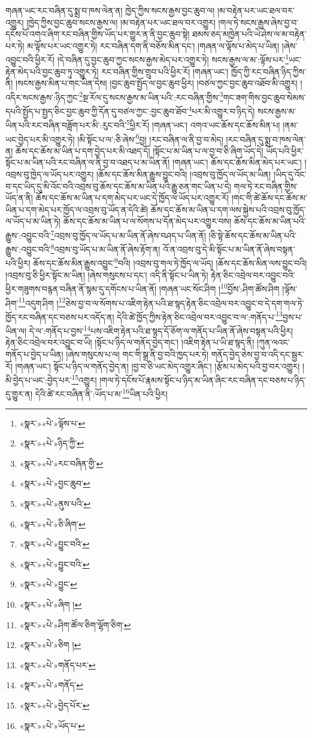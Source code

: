 གཞན་ཡང་རང་བཞིན་དུ་སྨྲ་བ་ཁས་ལེན་ན། ཁྱེད་ཀྱིས་སངས་རྒྱས་བྱང་ཆུབ་ལ། །མ་བརྟེན་པར་ཡང་ཐལ་བར་འགྱུར། །ཁྱེད་ཀྱིས་བྱང་ཆུབ་སངས་རྒྱས་ལ། །མ་བརྟེན་པར་ཡང་ཐལ་བར་འགྱུར། །གལ་ཏེ་སངས་རྒྱས་ཞེས་བྱ་བ་དངོས་པོ་འགའ་ཞིག་རང་བཞིན་གྱིས་ཡོད་པར་གྱུར་ན་ནི་བྱང་ཆུབ་སྟེ། ཐམས་ཅད་མཁྱེན་པའི་ཡེ་ཤེས་ལ་མ་བརྟེན་པར་ཏེ། མ་ལྟོས་པར་ཡང་འགྱུར་ཏེ། རང་བཞིན་དག་ནི་བཅོས་མིན་དང་། །གཞན་ལ་ལྟོས་པ་མེད་པ་ཡིན། །ཞེས་འབྱུང་བའི་ཕྱིར་རོ། །དེ་བཞིན་དུ་བྱང་ཆུབ་ཀྱང་སངས་རྒྱས་མེད་པར་འགྱུར་ཏེ། སངས་རྒྱས་ལ་མ་:ལྟོས་པར་\footnote{«སྣར་»«པེ་»ལྟོས་པ་}ཡང་རྟེན་མེད་པའི་བྱང་ཆུབ་ཏུ་འགྱུར་ཏེ། རང་བཞིན་གྱིས་གྲུབ་པའི་ཕྱིར་རོ། །གཞན་ཡང་། ཁྱོད་ཀྱི་རང་བཞིན་ཉིད་ཀྱིས་ནི། །སངས་རྒྱས་མིན་པ་གང་ཡིན་དེས། །བྱང་ཆུབ་སྤྱོད་ལ་བྱང་ཆུབ་ཕྱིར། །བཙལ་ཀྱང་བྱང་ཆུབ་འཐོབ་མི་འགྱུར། །འདིར་སངས་རྒྱས་:ཉིད་ཀྱང་\footnote{«སྣར་»«པེ་»ཉིད་ཀྱི་}སྔ་རོལ་དུ་སངས་རྒྱས་མ་ཡིན་པའི་:རང་བཞིན་གྱིས་\footnote{«སྣར་»«པེ་»རང་བཞིན་གྱི་}གང་ཟག་གིས་བྱང་ཆུབ་སེམས་དཔའི་སྤྱོད་པ་སྤྱད་ཅིང་བྱང་ཆུབ་ཀྱི་དོན་དུ་བཙལ་ཀྱང་:བྱང་ཆུབ་ཐོབ་\footnote{«སྣར་»«པེ་»བྱང་ཆུབ་}པར་མི་འགྱུར་བ་ཉིད་དེ། སངས་རྒྱས་མ་ཡིན་པའི་རང་བཞིན་བཟློག་པར་མི་:རུང་བའི་\footnote{«སྣར་»«པེ་»ནུས་པའི་}ཕྱིར་རོ། །གཞན་ཡང་། འགའ་ཡང་ཆོས་དང་ཆོས་མིན་པ། །ནམ་ཡང་བྱེད་པར་མི་འགྱུར་ཏེ། །མི་སྟོང་པ་ལ་:ཅི་ཞེས་\footnote{«སྣར་»«པེ་»ཅི་ཞིག་}བྱ། །རང་བཞིན་ལ་ནི་བྱ་བ་མེད། །རང་བཞིན་དུ་སྨྲ་བ་ཁས་ལེན་ན། ཆོས་དང་ཆོས་མ་ཡིན་པ་དག་བྱེད་པར་མི་འཐད་དོ། །སྟོང་པ་མ་ཡིན་པ་ལ་བྱ་བ་ཅི་ཞིག་ཡོད་དེ། ཡོད་པའི་ཕྱིར་སྟོང་པ་མ་ཡིན་པའི་རང་བཞིན་ལ་ནི་བྱ་བ་འཐད་པ་མ་ཡིན་ནོ། །གཞན་ཡང་། ཆོས་དང་ཆོས་མིན་མེད་པར་ཡང་། །འབྲས་བུ་ཁྱེད་ལ་ཡོད་པར་འགྱུར། །ཆོས་དང་ཆོས་མིན་རྒྱུས་བྱུང་བའི། །འབྲས་བུ་ཁྱོད་ལ་ཡོད་མ་ཡིན། །ཡིད་དུ་འོང་བ་དང་ཡིད་དུ་མི་འོང་བའི་འབྲས་བུ་ཆོས་དང་ཆོས་མ་ཡིན་པའི་རྒྱུ་ཅན་གང་ཡིན་པ་དེ། གལ་ཏེ་རང་བཞིན་གྱིས་ཡོད་ན་ནི། ཆོས་དང་ཆོས་མ་ཡིན་པ་དག་མེད་པར་ཡང་དེ་ཁྱོད་ལ་ཡོད་པར་འགྱུར་རོ། །གང་གི་ཚེ་ཆོས་དང་ཆོས་མ་ཡིན་པ་དག་མེད་པར་ཁྱོད་ལ་འབྲས་བུ་ཡོད་ན་དེའི་ཚེ། ཆོས་དང་ཆོས་མ་ཡིན་པ་དག་ལས་སྐྱེས་པའི་འབྲས་བུ་ཁྱོད་ལ་ཡོད་པ་མ་ཡིན་ཏེ། ཆོས་དང་ཆོས་མ་ཡིན་པ་ལ་སོགས་པ་དོན་མེད་པར་འགྱུར་བས། ཆོས་དང་ཆོས་མ་ཡིན་པའི་རྒྱུས་:འབྱུང་བའི་\footnote{«སྣར་»«པེ་»བྱུང་བའི་}འབྲས་བུ་ཁྱོད་ལ་ཡོད་པ་མ་ཡིན་ནོ་ཞེས་བཤད་པ་ཡིན་ནོ། །ཅི་སྟེ་ཆོས་དང་ཆོས་མ་ཡིན་པའི་རྒྱུས་:འབྱུང་བའི་\footnote{«སྣར་»«པེ་»བྱུང་བའི་}འབྲས་བུ་ཡོད་པ་མ་ཡིན་ནོ་ཞེས་རྟོག་ན། འོ་ན་འབྲས་བུ་དེ་མི་སྟོང་པ་མ་ཡིན་ནོ་ཞེས་བསྟན་པའི་ཕྱིར། ཆོས་དང་ཆོས་མིན་རྒྱུས་འབྱུང་\footnote{«སྣར་»«པེ་»བྱུང་}བའི། །འབྲས་བུ་གལ་ཏེ་ཁྱོད་ལ་ཡོད། །ཆོས་དང་ཆོས་མིན་ལས་བྱུང་བའི། །འབྲས་བུ་ཅི་ཕྱིར་སྟོང་མ་ཡིན། །ཞེས་གསུངས་པ་དང་། འདི་ནི་སྟོང་པ་ཡིན་ཏེ། རྟེན་ཅིང་འབྲེལ་བར་འབྱུང་བའི་ཕྱིར་གཟུགས་བརྙན་བཞིན་ནོ་སྙམ་དུ་དགོངས་པ་ཡིན་ནོ། །གཞན་ཡང་སོང་ཤིག །\footnote{«སྣར་»«པེ་»ཞིག །}བྱོས་:ཤིག་ཚོས་ཤིག །ལྟོས་ཤིག་\footnote{«སྣར་»«པེ་»ཤིག་ཚོལ་ཅིག་ལྷོག་ཅིག་}འདུག་ཤིག །\footnote{«སྣར་»«པེ་»ཅིག །}ཅེས་བྱ་བ་ལ་སོགས་པ་འཇིག་རྟེན་པའི་ཐ་སྙད་རྟེན་ཅིང་འབྲེལ་བར་འབྱུང་བ་དེ་དག་གལ་ཏེ་ཁྱོད་རང་བཞིན་དང་བཅས་པར་འདོད་ན། དེའི་ཚེ་ཁྱོད་ཀྱིས་རྟེན་ཅིང་འབྲེལ་བར་འབྱུང་བ་ལ་:གནོད་པ་\footnote{«སྣར་»«པེ་»གནོད་པར་}བྱས་པ་ཡིན་ལ། དེ་ལ་:གནོད་པ་བྱས་\footnote{«སྣར་»«པེ་»གནོད་}པས་འཇིག་རྟེན་པའི་ཐ་སྙད་དོ་ཅོག་ལ་གནོད་པ་ཡིན་ནོ་ཞེས་བསྟན་པའི་ཕྱིར། རྟེན་ཅིང་འབྲེལ་བར་འབྱུང་བ་ཡི། །སྟོང་པ་ཉིད་ལ་གནོད་བྱེད་གང་། །འཇིག་རྟེན་པ་ཡི་ཐ་སྙད་ནི། །ཀུན་ལའང་གནོད་པ་བྱེད་པ་ཡིན། །ཞེས་གསུངས་པ་ལ། གང་གི་སྒྲ་ནི་བྱ་བའི་ཁྱད་པར་ཏེ། གནོད་བྱེད་ཅེས་བྱ་བ་འདི་དང་སྦྱར་རོ། །གཞན་ཡང་། སྟོང་པ་ཉིད་ལ་གནོད་བྱེད་ན། །བྱ་བ་ཅི་ཡང་མེད་འགྱུར་ཞིང་། །རྩོམ་པ་མེད་པའི་བྱ་བར་འགྱུར། །མི་བྱེད་པ་ཡང་:བྱེད་པར་\footnote{«སྣར་»«པེ་»བྱེད་པོར་}འགྱུར། །གལ་ཏེ་དངོས་པོ་རྣམས་སྟོང་པ་ཉིད་མ་ཡིན་ཞིང་རང་བཞིན་དང་བཅས་པ་ཉིད་དུ་གྱུར་ན། དེའི་ཚེ་རང་བཞིན་ནི་:ཡོད་པ་མ་\footnote{«སྣར་»«པེ་»ཡོད་པ་}ཡིན་པའི་ཕྱིར། 